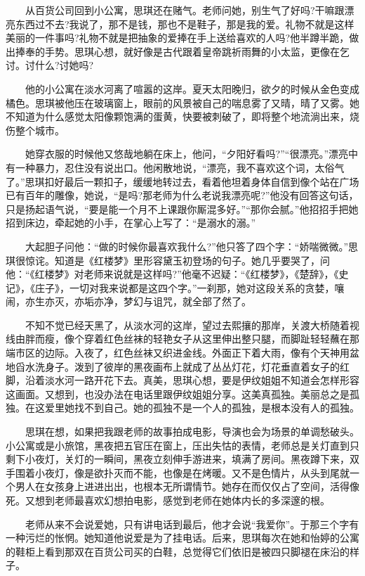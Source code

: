 \documentclass[12pt,UTF8]{ctexbook}
\begin{document}
　　从百货公司回到小公寓，思琪还在赌气。老师问她，别生气了好吗?干嘛跟漂亮东西过不去?我说了，那不是钱，那也不是鞋子，那是我的爱。礼物不就是这样美丽的一件事吗?礼物不就是把抽象的爱捧在手上送给喜欢的人吗?他半蹲半跪，做出捧奉的手势。思琪心想，就好像是古代跟着皇帝跳祈雨舞的小太监，更像在乞讨。讨什么?讨她吗?

　　他的小公寓在淡水河离了喧嚣的这岸。夏天太阳晚归，欲夕的时候从金色变成橘色。思琪被他压在玻璃窗上，眼前的风景被自己的喘息雾了又晴，晴了又雾。她不知道为什么感觉太阳像颗饱满的蛋黄，快要被刺破了，即将整个地流淌出来，烧伤整个城市。

　　她穿衣服的时候他又悠哉地躺在床上，他问，\enquote{夕阳好看吗?}\enquote{很漂亮。}漂亮中有一种暴力，忍住没有说出口。他闲散地说，\enquote{漂亮，我不喜欢这个词，太俗气了。}思琪扣好最后一颗扣子，缓缓地转过去，看着他坦着身体自信到像个站在广场已有百年的雕像，她说，\enquote{是吗?那老师为什么老说我漂亮呢?}他没有回答这句话，只是扬起语气说，\enquote{要是能一个月不上课跟你厮混多好。}\enquote{那你会腻。}他招招手把她招到床边，牵起她的小手，在掌心上写了：\enquote{是溺水的溺。}

　　大起胆子问他：\enquote{做的时候你最喜欢我什么?}他只答了四个字：\enquote{娇喘微微。}思琪很惊诧。知道是《红楼梦》里形容黛玉初登场的句子。她几乎要哭了，问他：\enquote{《红楼梦》对老师来说就是这样吗?}他毫不迟疑：\enquote{《红楼梦》，《楚辞》，《史记》，《庄子》，一切对我来说都是这四个字。}一刹那，她对这段关系的贪婪，嚷闹，亦生亦灭，亦垢亦净，梦幻与诅咒，就全部了然了。

　　不知不觉已经天黑了，从淡水河的这岸，望过去熙攘的那岸，关渡大桥随着视线由胖而瘦，像个穿着红色丝袜的轻艳女子从这里伸出整只腿，而脚趾轻轻蘸在那端市区的边际。入夜了，红色丝袜又织进金线。外面正下着大雨，像有个天神用盆地舀水洗身子。泼到了彼岸的黑夜画布上就成了丛丛灯花，灯花垂直着女子的红脚，沿着淡水河一路开花下去。真美，思琪心想，要是伊纹姐姐不知道会怎样形容这画面。又想到，也没办法在电话里跟伊纹姐姐分享。这美真孤独。美丽总之是孤独。在这爱里她找不到自己。她的孤独不是一个人的孤独，是根本没有人的孤独。

　　思琪在想，如果把我跟老师的故事拍成电影，导演也会为场景的单调愁破头。小公寓或是小旅馆，黑夜把五官压在窗上，压出失怙的表情，老师总是关灯直到只剩下小夜灯，关灯的一瞬间，黑夜立刻伸手游进来，填满了房间。黑夜蹲下来，双手围着小夜灯，像是欲扑灭而不能，也像是在烤暖。又不是色情片，从头到尾就一个男人在女孩身上进进出出，也根本无所谓情节。她存在而仅仅占了空间，活得像死。又想到老师最喜欢幻想拍电影，感觉到老师在她体内长的多深邃的根。

　　老师从来不会说爱她，只有讲电话到最后，他才会说\enquote{我爱你}。于那三个字有一种污烂的怅惘。她知道他说爱是为了挂电话。后来，思琪每次在她和怡婷的公寓的鞋柜上看到那双在百货公司买的白鞋，总觉得它们依旧是被四只脚褪在床沿的样子。
\end{document}
